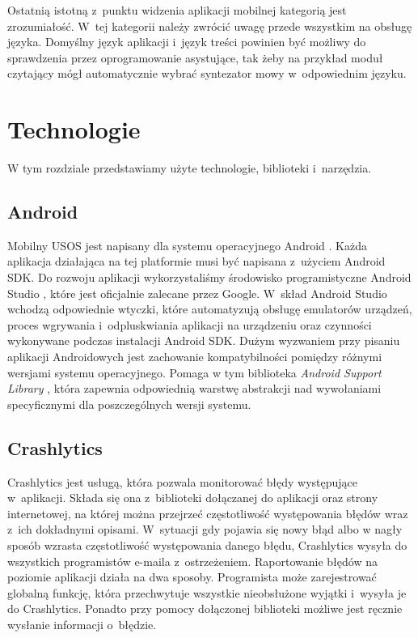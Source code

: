 \documentclass{pracamgr}
\begin{document}
Ostatnią istotną z~punktu widzenia aplikacji mobilnej kategorią jest zrozumiałość.
W~tej kategorii należy zwrócić uwagę przede wszystkim na obsługę języka.
Domyślny język aplikacji i~język treści powinien być możliwy do sprawdzenia przez
oprogramowanie asystujące, tak żeby na przykład moduł czytający mógł automatycznie wybrać
syntezator mowy w~odpowiednim języku.

\chapter{Technologie}

W tym rozdziale przedstawiamy użyte technologie, biblioteki i~narzędzia.

\section{Android}

Mobilny USOS jest napisany dla systemu operacyjnego Android \cite{android}.
Każda aplikacja działająca na tej platformie musi być napisana z~użyciem Android
SDK. Do rozwoju aplikacji wykorzystaliśmy środowisko programistyczne Android Studio
\cite{androidstudio}, które jest oficjalnie zalecane przez Google. W~skład Android Studio
wchodzą odpowiednie wtyczki, które automatyzują obsługę emulatorów urządzeń, proces
wgrywania i~odpluskwiania aplikacji na urządzeniu oraz czynności wykonywane podczas
instalacji Android SDK. Dużym wyzwaniem przy pisaniu aplikacji Androidowych jest
zachowanie kompatybilności pomiędzy różnymi wersjami systemu operacyjnego. Pomaga
w tym biblioteka \textit{Android Support Library} \cite{androidsupportlibrary},
która zapewnia odpowiednią warstwę abstrakcji nad wywołaniami specyficznymi dla
poszczególnych wersji systemu.

\section{Crashlytics}

Crashlytics \cite{crashlytics} jest usługą, która pozwala monitorować błędy
występujące w~aplikacji. Składa się ona z~biblioteki dołączanej do aplikacji
oraz strony internetowej, na której można przejrzeć częstotliwość występowania
błędów wraz z~ich dokładnymi opisami. W~sytuacji gdy pojawia się nowy błąd albo
w nagły sposób wzrasta częstotliwość występowania danego błędu, Crashlytics wysyła
do wszystkich programistów e-maila z~ostrzeżeniem. Raportowanie błędów na poziomie
aplikacji działa na dwa sposoby. Programista może zarejestrować globalną funkcję,
która przechwytuje wszystkie nieobsłużone wyjątki i~wysyła je do Crashlytics. Ponadto przy
pomocy dołączonej biblioteki możliwe jest ręcznie wysłanie informacji o~błędzie.
\end{document}
